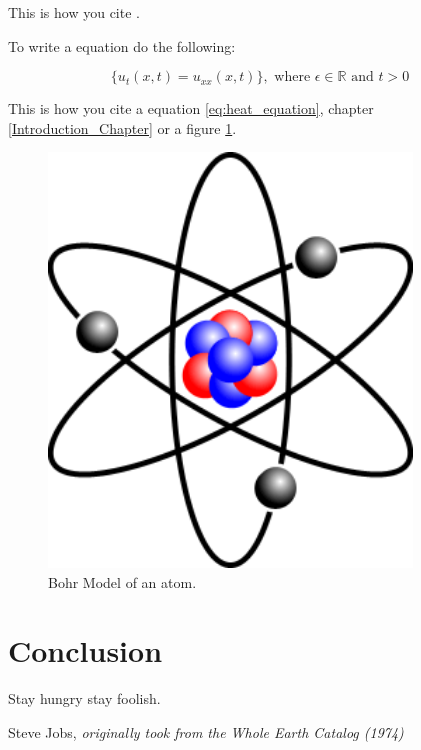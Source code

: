 \documentclass[12pt, twoside,openright]{report}
\begin{document}
\begin{spacing}{1.5}
This is how you cite \citep{Abbott:2016blz}.  

To write a equation do the following:

\begin{equation}
\{ u_t(x,t)=u_{xx}(x,t)\}, \text{ where $\epsilon\in\mathbb{R}$ and $t>0$}
\label{eq:heat_equation}
\end{equation}

This is how you cite a equation \ref{eq:heat_equation}, chapter \ref{Introduction_Chapter} or a figure \ref{fig:Bohr_Model}.




\begin{figure}
    \centering
    \includegraphics[width=\textwidth, height=11cm]{Bohr_Model.png}
    \caption{Bohr Model of an atom.}
    \label{fig:Bohr_Model}
\end{figure}













\chapter{Conclusion}

\epigraph{Stay hungry stay foolish.}{Steve Jobs, \textit{originally took from the Whole Earth Catalog (1974)}}




\end{spacing}
\end{document}
